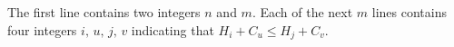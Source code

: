 The first line contains two integers $n$ and $m$.
Each of the next $m$ lines contains four integers $i ,\, u ,\, j ,\, v$ indicating that $H_i + C_u \le H_j + C_v$.
